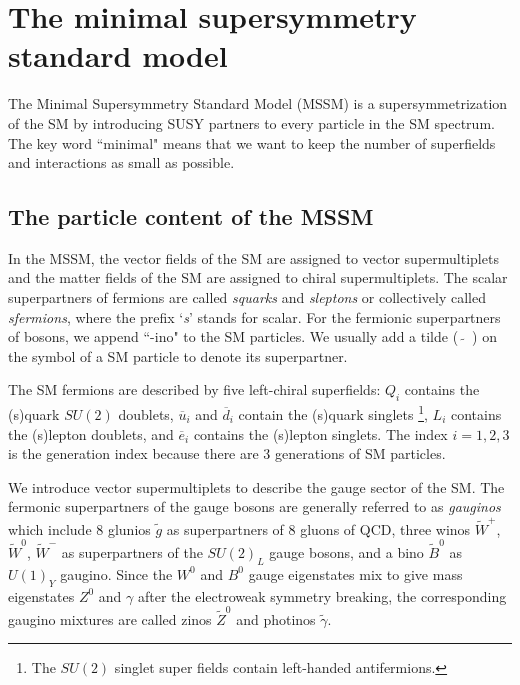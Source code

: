 \documentclass[12pt]{report}
\begin{document}
\chapter{The minimal supersymmetry standard model}
The Minimal Supersymmetry Standard Model (MSSM) is a supersymmetrization of the SM by introducing SUSY partners to every particle in the SM spectrum. 
The key word ``minimal" means that we want to keep the number of superfields and interactions as small as possible. 



\section{The particle content of the MSSM}
In the MSSM, the vector fields of the SM are assigned to vector supermultiplets and the matter fields of the SM are assigned to chiral supermultiplets.
The scalar superpartners of fermions are called \textit{squarks} and \textit{sleptons} or collectively called \textit{sfermions}, where the prefix `\textit{s}' stands for scalar.
For the fermionic superpartners of bosons, we append ``-ino" to the SM particles.
We usually add a tilde ($\widetilde{ \quad }$) on the symbol of a SM particle to denote its superpartner.

The SM fermions are described by five left-chiral superfields: $Q_{i}$ contains the (s)quark $SU(2)$ doublets, $\overline{u}_{i}$  and $\overline{d}_{i}$ contain the (s)quark singlets \footnote{The $SU(2)$ singlet super fields contain left-handed antifermions.}, $L_{i}$ contains the (s)lepton doublets, and $\overline{e}_{i}$ contains the (s)lepton singlets.
The index $i = 1, 2, 3$ is the generation index because there are 3 generations of SM particles.

We introduce vector supermultiplets to describe the gauge sector of the SM.
The fermonic superpartners of the gauge bosons are generally referred to as \textit{gauginos} which include 8 glunios $\widetilde{g}$ as superpartners of 8 gluons of QCD, three winos $\widetilde{W}^{+}$, $\widetilde{W}^{0}$, $\widetilde{W}^{-}$ as superpartners of the $SU(2)_{L}$ gauge bosons, and a bino $\widetilde{B}^{0}$ as $U(1)_{Y}$ gaugino.
Since the $W^{0}$ and $B^{0}$ gauge eigenstates mix to give mass eigenstates $Z^{0}$ and $\gamma$ after the electroweak symmetry breaking, the corresponding gaugino mixtures are called zinos $\widetilde{Z}^{0}$ and photinos $\widetilde{\gamma}$.
\end{document}
